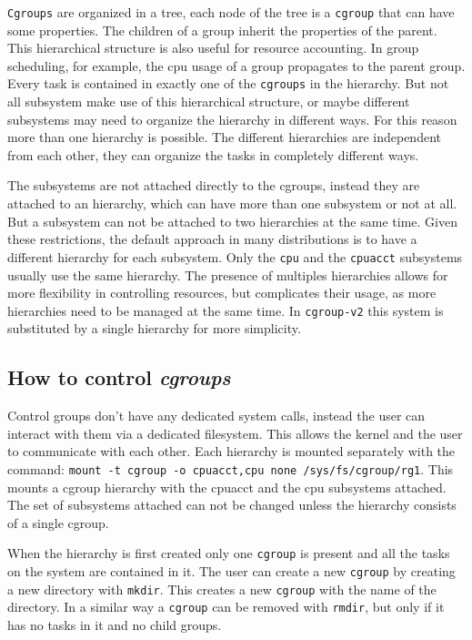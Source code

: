 \verb|Cgroups| are organized in a tree, each node of the tree is a \verb|cgroup| that can have some properties. The children of a group inherit the properties of the parent. This hierarchical structure is also useful for resource accounting. In group scheduling, for example, the cpu usage of a group propagates to the parent group. Every task is contained in exactly one of the \verb|cgroups| in the hierarchy. But not all subsystem make use of this hierarchical structure, or maybe different subsystems may need to organize the hierarchy in different ways. For this reason more than one hierarchy is possible. The different hierarchies are independent from each other, they can organize the tasks in completely different ways.

The subsystems are not attached directly to the cgroups, instead they are attached to an hierarchy, which can have more than one subsystem or not at all. But a subsystem can not be attached to two hierarchies at the same time. Given these restrictions, the default approach in many distributions is to have a different hierarchy for each subsystem. Only the \verb|cpu| and the \verb|cpuacct| subsystems usually use the same hierarchy. The presence of multiples hierarchies allows for more flexibility in controlling resources, but complicates their usage, as more hierarchies need to be managed at the same time. In \verb|cgroup-v2| this system is substituted by a single hierarchy for more simplicity.

\subsection{How to control \textit{cgroups}}
Control groups don't have any dedicated system calls, instead the user can interact with them via a dedicated filesystem. This allows the kernel and the user to communicate with each other. Each hierarchy is mounted separately with the command: \verb|mount -t cgroup -o cpuacct,cpu none /sys/fs/cgroup/rg1|. \newline This mounts a cgroup hierarchy with the cpuacct and the cpu subsystems attached. The set of subsystems attached can not be changed unless the hierarchy consists of a single cgroup.

When the hierarchy is first created only one \verb|cgroup| is present and all the tasks on the system are contained in it. The user can create a new \verb|cgroup| by creating a new directory with \verb|mkdir|. This creates a new \verb|cgroup| with the name of the directory. In a similar way a \verb|cgroup| can be removed with \verb|rmdir|, but only if it has no tasks in it and no child groups. 

